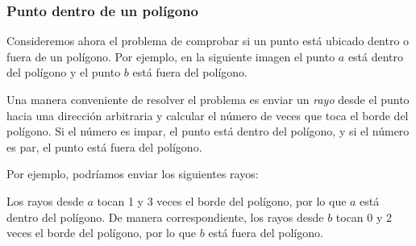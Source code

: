 \subsubsection{Punto dentro de un polígono}

Consideremos ahora el problema de
comprobar si un punto está ubicado dentro o fuera de
un polígono.
Por ejemplo, en la siguiente imagen el punto $a$
está dentro del polígono y el punto $b$ está fuera
del polígono.

\begin{center}
\end{center}

Una manera conveniente de resolver el problema es
enviar un \emph{rayo} desde el punto hacia una dirección arbitraria
y calcular el número de veces que toca
el borde del polígono.
Si el número es impar,
el punto está dentro del polígono,
y si el número es par,
el punto está fuera del polígono.

\begin{samepage}
Por ejemplo, podríamos enviar los siguientes rayos:
\begin{center}
\end{center}
\end{samepage}

Los rayos desde $a$ tocan 1 y 3 veces
el borde del polígono,
por lo que $a$ está dentro del polígono.
De manera correspondiente, los rayos desde $b$
tocan 0 y 2 veces el borde del polígono,
por lo que $b$ está fuera del polígono.

